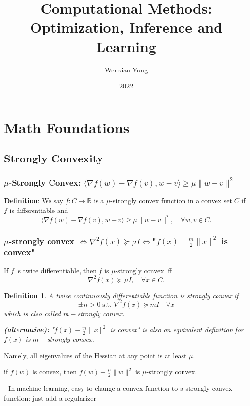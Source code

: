 \documentclass[11pt,a4paper]{article}
\title{\textbf{Computational Methods: Optimization, Inference and Learning}}
\author[*]{Wenxiao Yang}
\affil[*]{Department of Mathematics, University of Illinois at Urbana-Champaign}
\date{2022}
\newtheorem{definition}{Definition}
\begin{document}
\maketitle
\tableofcontents
\newpage

\section{Math Foundations}
\subsection{Strongly Convexity}
\subsubsection{$\mu$-Strongly Convex: $
\langle\nabla f(w)-\nabla f(v), w-v\rangle \geq \mu\|w-v\|^{2}$}
\textbf{Definition}: We say $f: C \rightarrow \mathbb{R}$ is a $\mu$-strongly convex function in a convex set $C$ if $f$ is differentiable and
$$
\langle\nabla f(w)-\nabla f(v), w-v\rangle \geq \mu\|w-v\|^{2}, \quad \forall w, v \in C .
$$
\subsubsection{$\mu$-strongly convex $\Leftrightarrow \nabla^{2} f(x) \succeq \mu I\Leftrightarrow$"$f(x)-\frac{m}{2}\|x\|^2$ is convex"}
If $f$ is twice differentiable, then $f$ is $\mu$-strongly convex iff
$$
\nabla^{2} f(x) \succeq \mu I, \quad \forall x \in C .
$$
\begin{definition}
    A twice continuously differentiable function is \underline{strongly convex} if $$\exists m>0\text{ s.t. }\nabla^2 f(x)\succeq mI\quad \forall x$$
    which is also called $m-$strongly convex.

    \textbf{(alternative):} "$f(x)-\frac{m}{2}\|x\|^2$ is convex" is also an equivalent definition for $f(x)$ is $m-$strongly convex.
\end{definition}

Namely, all eigenvalues of the Hessian at any point is at least $\mu$.

if $f(w)$ is convex, then $f(w)+\frac{\mu}{2}\|w\|^{2}$ is $\mu$-strongly convex.

- In machine learning, easy to change a convex function to a strongly convex function: just add a regularizer
\end{document}
